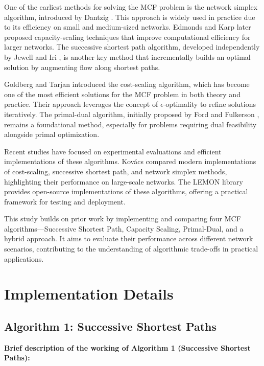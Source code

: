 \documentclass{article}
\begin{document}
One of the earliest methods for solving the MCF problem is the network simplex algorithm, introduced by Dantzig \cite{Dantzig1951}. This approach is widely used in practice due to its efficiency on small and medium-sized networks. Edmonds and Karp \cite{Edmonds1972} later proposed capacity-scaling techniques that improve computational efficiency for larger networks. The successive shortest path algorithm, developed independently by Jewell \cite{Jewell1958} and Iri \cite{Iri1960}, is another key method that incrementally builds an optimal solution by augmenting flow along shortest paths.

Goldberg and Tarjan \cite{Goldberg1989} introduced the cost-scaling algorithm, which has become one of the most efficient solutions for the MCF problem in both theory and practice. Their approach leverages the concept of $\epsilon$-optimality to refine solutions iteratively. The primal-dual algorithm, initially proposed by Ford and Fulkerson \cite{FordFulkerson1962}, remains a foundational method, especially for problems requiring dual feasibility alongside primal optimization.

Recent studies have focused on experimental evaluations and efficient implementations of these algorithms. Kovács \cite{kovacs2015minimum} compared modern implementations of cost-scaling, successive shortest path, and network simplex methods, highlighting their performance on large-scale networks. The LEMON library \cite{LEMON} provides open-source implementations of these algorithms, offering a practical framework for testing and deployment.

This study builds on prior work by implementing and comparing four MCF algorithms—Successive Shortest Path, Capacity Scaling, Primal-Dual, and a hybrid approach. It aims to evaluate their performance across different network scenarios, contributing to the understanding of algorithmic trade-offs in practical applications.



\section{Implementation Details}

\subsection{Algorithm 1: Successive Shortest Paths}

\textbf{Brief description of the working of Algorithm 1 (Successive Shortest Paths):}
\end{document}
